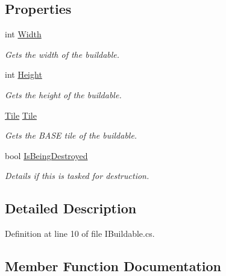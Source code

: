 \subsection*{Properties}
\begin{DoxyCompactItemize}
\item 
int \hyperlink{interface_i_buildable_aaf39e1c6e66f8afa6d8aab0806d65309}{Width}
\begin{DoxyCompactList}\small\item\em Gets the width of the buildable. \end{DoxyCompactList}\item 
int \hyperlink{interface_i_buildable_ab50da031a30c904d22053badaf1b2fdd}{Height}
\begin{DoxyCompactList}\small\item\em Gets the height of the buildable. \end{DoxyCompactList}\item 
\hyperlink{class_tile}{Tile} \hyperlink{interface_i_buildable_ad5ced6a828603f1c03afbfbb922285e1}{Tile}
\begin{DoxyCompactList}\small\item\em Gets the B\+A\+SE tile of the buildable. \end{DoxyCompactList}\item 
bool \hyperlink{interface_i_buildable_a87361d1de41fda5ad8053a0053ea1b11}{Is\+Being\+Destroyed}
\begin{DoxyCompactList}\small\item\em Details if this is tasked for destruction. \end{DoxyCompactList}\end{DoxyCompactItemize}


\subsection{Detailed Description}


Definition at line 10 of file I\+Buildable.\+cs.



\subsection{Member Function Documentation}
\mbox{\label{interface_i_buildable_ab1f899fc1d9ece21b46612d6119f744d}} 
